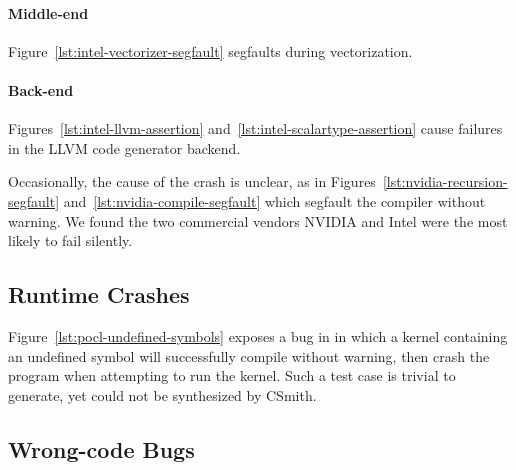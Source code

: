 \paragraph{Middle-end} Figure~\ref{lst:intel-vectorizer-segfault} segfaults during vectorization.

\paragraph{Back-end} Figures~\ref{lst:intel-llvm-assertion} and~\ref{lst:intel-scalartype-assertion} cause failures in the LLVM code generator backend.

Occasionally, the cause of the crash is unclear, as in Figures~\ref{lst:nvidia-recursion-segfault} and~\ref{lst:nvidia-compile-segfault} which segfault the compiler without warning. We found the two commercial vendors NVIDIA and Intel were the most likely to fail silently.



\subsection{Runtime Crashes}

Figure~\ref{lst:pocl-undefined-symbols} exposes a bug in in which a kernel containing an undefined symbol will successfully compile without warning, then crash the program when attempting to run the kernel. Such a test case is trivial to generate, yet could not be synthesized by CSmith.



\subsection{Wrong-code Bugs}

